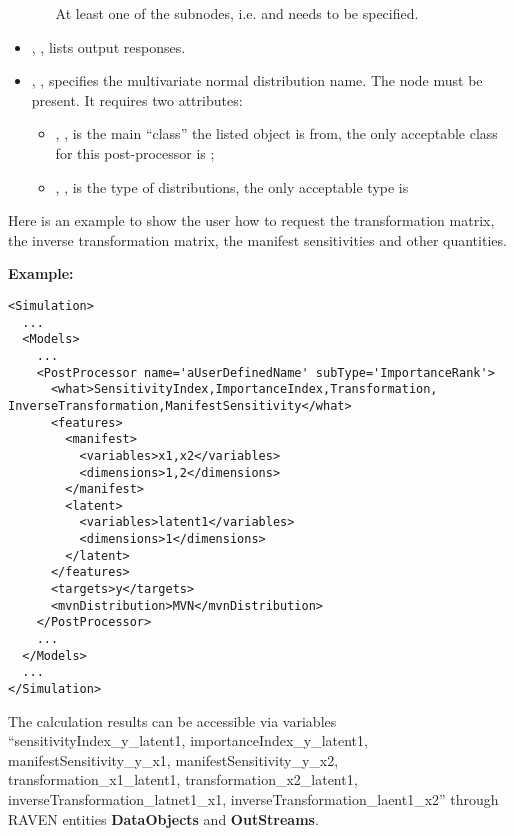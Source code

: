 \begin{itemize}
\begin{itemize}
\begin{itemize}
        \end{itemize}
      \nb At least one of the subnodes, i.e.  and  needs to be specified.
    \end{itemize}
  \item {}, , lists output responses.
  \item {}, , specifies the
  multivariate normal distribution name. The  node must be present. It requires two attributes:
    \begin{itemize}
      \item {}, , is the main
        ``class'' the listed object is from, the only acceptable class for
        this post-processor is ;
      \item {}, , is the type of distributions,
        the only acceptable type is  
    \end{itemize}
\end{itemize}
  Here is an example to show the user how to request the transformation matrix, the inverse transformation matrix, the
  manifest sensitivities and other quantities.

\textbf{Example:}
\begin{lstlisting}[style=XML,morekeywords={name,subType,debug}]
<Simulation>
  ...
  <Models>
    ...
    <PostProcessor name='aUserDefinedName' subType='ImportanceRank'>
      <what>SensitivityIndex,ImportanceIndex,Transformation, InverseTransformation,ManifestSensitivity</what>
      <features>
        <manifest>
          <variables>x1,x2</variables>
          <dimensions>1,2</dimensions>
        </manifest>
        <latent>
          <variables>latent1</variables>
          <dimensions>1</dimensions>
        </latent>
      </features>
      <targets>y</targets>
      <mvnDistribution>MVN</mvnDistribution>
    </PostProcessor>
    ...
  </Models>
  ...
</Simulation>
\end{lstlisting}

The calculation results can be accessible via variables ``sensitivityIndex\_y\_latent1, importanceIndex\_y\_latent1,
manifestSensitivity\_y\_x1, manifestSensitivity\_y\_x2, transformation\_x1\_latent1, transformation\_x2\_latent1,
inverseTransformation\_latnet1\_x1, inverseTransformation\_laent1\_x2'' through RAVEN entities \textbf{DataObjects}
and \textbf{OutStreams}.

